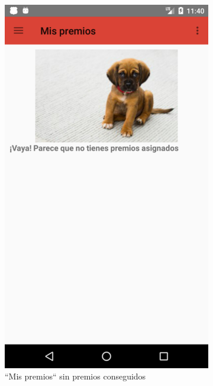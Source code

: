 \documentclass[twoside]{report}
\begin{document}
\begin{figure}[H]
\begin{center}
	\begin{subfigure}[t]{.3\linewidth}
		\includegraphics[scale=0.25]{images/userguide/9.png}
		\caption{“Mis premios“ sin premios conseguidos}
	\end{subfigure}\hspace{5mm}%
	\begin{subfigure}[t]{.3\linewidth}

\end{subfigure}
\end{center}
\end{figure}
\end{document}
